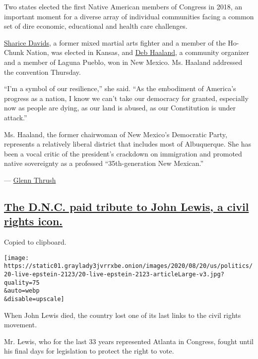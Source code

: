 Two states elected the first Native American members of Congress in
2018, an important moment for a diverse array of individual communities
facing a common set of dire economic, educational and health care
challenges.

\href{https://www.nytimes3xbfgragh.onion/2018/08/08/us/politics/sharice-davids-native-american-kansas.html}{Sharice
Davids}, a former mixed martial arts fighter and a member of the
Ho-Chunk Nation, was elected in Kansas, and
\href{https://www.nytimes3xbfgragh.onion/2018/06/06/us/deb-haaland-new-mexico-congress.html}{Deb
Haaland}, a community organizer and a member of Laguna Pueblo, won in
New Mexico. Ms. Haaland addressed the convention Thursday.

``I'm a symbol of our resilience,'' she said. ``As the embodiment of
America's progress as a nation, I know we can't take our democracy for
granted, especially now as people are dying, as our land is abused, as
our Constitution is under attack.''

Ms. Haaland, the former chairwoman of New Mexico's Democratic Party,
represents a relatively liberal district that includes most of
Albuquerque. She has been a vocal critic of the president's crackdown on
immigration and promoted native sovereignty as a professed
``35th-generation New Mexican.''

--- \href{https://www.nytimes3xbfgragh.onion/by/glenn-thrush}{Glenn
Thrush}

\hypertarget{the-dnc-paid-tribute-to-john-lewis-a-civil-rights-icon}{%
\subsection{\texorpdfstring{\protect\hyperlink{the-dnc-paid-tribute-to-john-lewis-a-civil-rights-icon}{The
D.N.C. paid tribute to John Lewis, a civil rights
icon.}}{The D.N.C. paid tribute to John Lewis, a civil rights icon.}}\label{the-dnc-paid-tribute-to-john-lewis-a-civil-rights-icon}}

Copied to clipboard.

\texttt{[image: https://static01.graylady3jvrrxbe.onion/images/2020/08/20/us/politics/20-live-epstein-2123/20-live-epstein-2123-articleLarge-v3.jpg?quality=75\\\&auto=webp\\\&disable=upscale]}

When John Lewis died, the country lost one of its last links to the
civil rights movement.

Mr. Lewis, who for the last 33 years represented Atlanta in Congress,
fought until his final days for legislation to protect the right to
vote.

